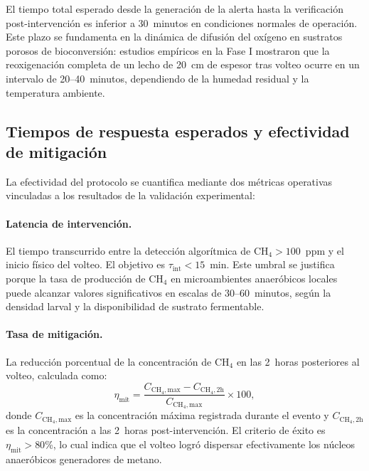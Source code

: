 El tiempo total esperado desde la generación de la alerta hasta la verificación post-intervención es inferior a 30~minutos en condiciones normales de operación. Este plazo se fundamenta en la dinámica de difusión del oxígeno en sustratos porosos de bioconversión: estudios empíricos en la Fase I mostraron que la reoxigenación completa de un lecho de 20~cm de espesor tras volteo ocurre en un intervalo de 20--40~minutos, dependiendo de la humedad residual y la temperatura ambiente.

\subsection{Tiempos de respuesta esperados y efectividad de mitigación}
\label{subsec:cap5_tiempos_efectividad}

La efectividad del protocolo se cuantifica mediante dos métricas operativas vinculadas a los resultados de la validación experimental:

\paragraph{Latencia de intervención.} El tiempo transcurrido entre la detección algorítmica de CH$_4 > 100$~ppm y el inicio físico del volteo. El objetivo es $\tau_{\mathrm{int}} < 15$~min. Este umbral se justifica porque la tasa de producción de CH$_4$ en microambientes anaeróbicos locales puede alcanzar valores significativos en escalas de 30--60~minutos, según la densidad larval y la disponibilidad de sustrato fermentable.

\paragraph{Tasa de mitigación.} La reducción porcentual de la concentración de CH$_4$ en las 2~horas posteriores al volteo, calculada como:
\begin{equation}
\eta_{\mathrm{mit}} = \frac{C_{\mathrm{CH_4,max}} - C_{\mathrm{CH_4,2h}}}{C_{\mathrm{CH_4,max}}} \times 100,
\label{eq:tasa_mitigacion}
\end{equation}
donde $C_{\mathrm{CH_4,max}}$ es la concentración máxima registrada durante el evento y $C_{\mathrm{CH_4,2h}}$ es la concentración a las 2~horas post-intervención. El criterio de éxito es $\eta_{\mathrm{mit}} > 80$\%, lo cual indica que el volteo logró dispersar efectivamente los núcleos anaeróbicos generadores de metano.

